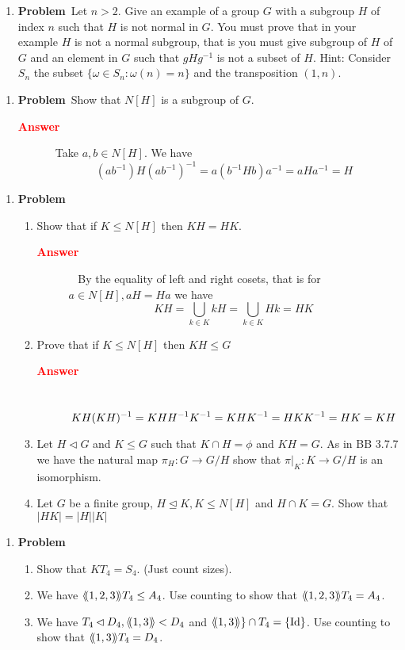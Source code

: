 \documentclass[12pt]{amsart}
\newcommand{\benu}{\begin{enumerate}}
\newcommand{\eenu}{\end{enumerate}}
\theoremstyle{definition}
\DeclareMathOperator{\Id}{Id}
\newcommand{\nts}{\negthinspace}
\newcommand{\itep}{\item {\bfseries Problem}\ }
\newcommand{\gen}[1]{\langle \nts#1 \nts\rangle}
\newcommand{\beans}{\begin{description} \item[{ \bfseries \textcolor{red}{Answer}}]\ }
\newcommand{\eans }{\end{description}}
\begin{document}
\newpage


\begin{enumerate}[resume=p]
\itep Let $n>2$. Give an example of a group $G$ with a subgroup $H$ of index $n$ such that $H$ is not normal in $G$. You must prove that in your example $H$ is not a  normal subgroup, that is you must give subgroup of $H$ of $G$ and an element in $G$ such that $gHg^{-1}$ is not a subset of $H$. Hint: Consider $S_n$ the subset $\{\omega\in S_n:\omega(n)=n\}$ and the transposition $(1,n)$.

\end{enumerate}

\newpage

\begin{enumerate}[resume=p]
\itep Show that $N[H]$ is a subgroup of $G$.
\beans Take $a, b\in N[H]$. We have 
\[(ab^{-1})H(ab^{-1})^{-1}=a(b^{-1}Hb)a^{-1}=aHa^{-1}=H\]
\eans
\end{enumerate}

\newpage

\begin{enumerate}[resume=p]
\itep 
\benu  
\item Show that if $K\leq N[H]$ then $KH=HK$.
\beans
By the equality of left and right cosets, that is for $a\in N[H],aH=Ha$ we have 
\[KH=\bigcup_{k\in K}kH=\bigcup_{k\in K}Hk=HK
\]

\eans
\item Prove that if $K\leq N[H]$ then $KH\leq G$
\beans
\[ KH(KH)^{-1}=KHH^{-1}K^{-1}\\=KHK^{-1}=HKK^{-1}=HK=KH
\]
\eans
\item\label{quotiso} Let $H\lhd G$ and $K\leq G$ such that $K\cap H=\phi$ and $KH=G$. As in BB 3.7.7 we have the natural map $\pi_H\colon G\to G/H$ show that $\pi|_K\colon K\to G/H$ is an isomorphism.
\item \label{count} Let $G$ be a finite group, $H\unlhd K,K\leq N[H]$ and $H\cap K=G$. Show that $|HK|=|H||K|$
\eenu
\end{enumerate}

\newpage

\begin{enumerate}[resume=p]
\itep
\benu
\item Show that $KT_4=S_4$. (Just count sizes).
\item We have $\gen{(1,2,3)}T_4\leq A_4$. Use counting  to show that $\gen{(1,2,3)}T_4=A_4$.


\item We have $T_4\lhd D_4, \gen{(1,3)}<D_4$ and $\gen{(1,3)}\}\cap T_4=\{\Id\}$. Use counting to show that $\gen{(1,3)}T_4=D_4$.
\eenu
\end{enumerate}
\end{document}
